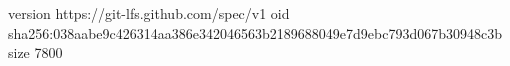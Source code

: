 version https://git-lfs.github.com/spec/v1
oid sha256:038aabe9c426314aa386e342046563b2189688049e7d9ebc793d067b30948c3b
size 7800
